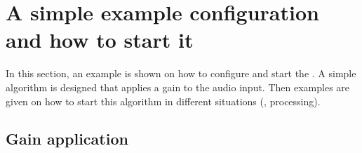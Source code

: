 
\section{A simple example configuration and how to start it}%
\label{sec:scenarios}%
%
%
%

In this section, an example is shown on how to configure and start the
\mha{}. A simple algorithm is designed that applies a gain to the audio input.
Then examples are given on how to start this algorithm in different situations (\mhad{}, \Matlab{} processing).

\subsection{Gain application}%
\label{sec:dyncmp}%

